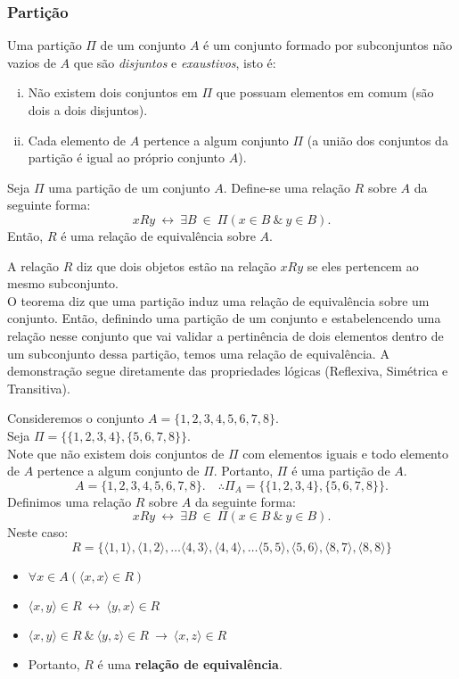 \subsubsection{Partição}
  \begin{definition}
    Uma partição $\Pi$ de um conjunto $A$ é um conjunto formado por subconjuntos não vazios de $A$ que são \textit{disjuntos} e \textit{exaustivos}, isto é:
      \begin{enumerate}[i.]
        \item Não existem dois conjuntos em $\Pi$ que possuam elementos em comum (são dois a dois disjuntos).
        \item Cada elemento de $A$ pertence a algum conjunto $\Pi$ (a união dos conjuntos da partição é igual ao próprio conjunto $A$).
      \end{enumerate}
  \end{definition}
  \begin{theorem}
    Seja $\Pi$ uma partição de um conjunto $A$. Define-se uma relação $R$ sobre $A$ da seguinte forma:
    $$xRy\ \leftrightarrow\ \exists B\ \in\ \Pi (x \in B\ \&\ y \in B).$$
    Então, $R$ é uma relação de equivalência sobre $A$.
  \end{theorem}
A relação $R$ diz que dois objetos estão na relação $xRy$ se eles pertencem ao mesmo subconjunto.\\
O teorema diz que uma partição induz uma relação de equivalência sobre um conjunto. Então, definindo uma partição de um conjunto e estabelencendo uma relação nesse conjunto que vai validar a pertinência de dois elementos dentro de um subconjunto dessa partição, temos uma relação de equivalência.
A demonstração segue diretamente das propriedades lógicas (Reflexiva, Simétrica e Transitiva).
\begin{exmp}
  Consideremos o conjunto $A = \{1,2,3,4,5,6,7,8\}.$\\
  Seja $\Pi = \{\{1,2,3,4\},\{5,6,7,8\}\}.$\\
  Note que não existem dois conjuntos de $\Pi$ com elementos iguais e todo elemento de $A$ pertence a algum conjunto de $\Pi$. Portanto, $\Pi$ é uma partição de $A$.
  $$A = \{1,2,3,4,5,6,7,8\}.\quad \therefore \Pi_{A} = \{\{1,2,3,4\},\{5,6,7,8\}\}.$$
  Definimos uma relação $R$ sobre $A$ da seguinte forma:
  $$xRy\ \leftrightarrow\ \exists B\ \in\ \Pi (x \in B\ \&\ y \in B).$$
  Neste caso:
  $$R = \{\langle 1, 1 \rangle ,\langle 1, 2 \rangle , \dots \langle 4, 3 \rangle , \langle 4, 4 \rangle , \dots \langle 5, 5 \rangle , \langle 5, 6 \rangle , \langle 8, 7 \rangle , \langle 8, 8 \rangle \}$$
    \begin{itemize}
      \item $\forall x \in A(\langle x, x \rangle \in R)$
      \item $\langle x, y \rangle \in R\ \leftrightarrow\ \langle y, x \rangle \in R$
      \item $\langle x, y \rangle \in R\ \&\ \langle y, z \rangle \in R\ \rightarrow\ \langle x, z \rangle \in R$
      \item Portanto, $R$ é uma \textbf{relação de equivalência}.
    \end{itemize}    
\end{exmp}
